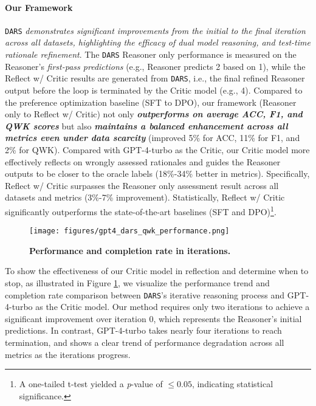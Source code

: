 \paragraph{Our Framework} \texttt{DARS} \emph{demonstrates significant improvements from the initial to the final iteration across all datasets, highlighting the efficacy of dual model reasoning, and test-time rationale refinement}. The \texttt{DARS} Reasoner only performance is measured on the Reasoner's \emph{first-pass predictions} (e.g., Reasoner predicts \textcircled{\raisebox{-0.3pt} {\scriptsize2}} based on \textcircled{\raisebox{-0.3pt} {\scriptsize1}}), while the Reflect w/ Critic results are generated from \texttt{DARS}, i.e., %
the final refined Reasoner output before the loop is terminated by the Critic model (e.g.,\textcircled{\raisebox{-0.3pt} {\scriptsize4}}). Compared to the preference optimization baseline (SFT to DPO), our framework (Reasoner only to Reflect w/ Critic) not only \textbf{\emph{outperforms on average ACC, F1, and QWK scores}} but also \textbf{\emph{maintains a balanced enhancement across all metrics even under data scarcity}} (improved 5\% for ACC, 11\% for F1, and 2\% for QWK). Compared with GPT-4-turbo as the Critic, our Critic model more effectively reflects on wrongly assessed rationales and guides the Reasoner outputs to be closer to the oracle labels (18\%-34\% better in metrics). Specifically, Reflect w/ Critic surpasses the Reasoner only assessment result across all datasets and metrics (3\%-7\% improvement). Statistically, Reflect w/ Critic significantly outperforms the state-of-the-art baselines (SFT and DPO)\footnote{A one-tailed t-test yielded a \emph{p}-value of $\leq 0.05$, indicating statistical significance.}. 



 \begin{figure}[ht]
\centering
\texttt{[image: figures/gpt4\_dars\_qwk\_performance.png]}
\caption{\small \textbf{Performance and completion rate in iterations.}}
\vspace{-2mm}
\label{fig:iteration}
\end{figure}

To show the effectiveness of our Critic model in reflection and determine when to stop, as illustrated in Figure \ref{fig:iteration}, we visualize the performance trend and completion rate comparison between \texttt{DARS}’s iterative reasoning process and GPT-4-turbo as the Critic model. Our method requires only two iterations to achieve a significant improvement over iteration 0, which represents the Reasoner’s initial predictions. In contrast, GPT-4-turbo takes nearly four iterations to reach termination, and shows a clear trend of performance degradation across all metrics as the iterations progress.




